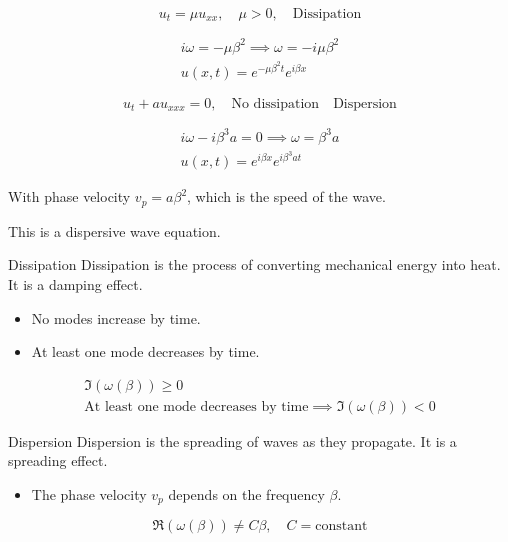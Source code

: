 \begin{example}{}{}
  \[
    u_t = \mu u_{xx}, \quad \mu > 0, \quad \text{Dissipation}
  \]

  \begin{align*}
    i\omega = -\mu \beta^2 \implies \omega = -i\mu \beta^2 \\
    u(x,t) = e^{-\mu \beta^2 t}e^{i\beta x}
  \end{align*}

\end{example}

\begin{example}{}{}
  \[
    u_t + a u_{xxx} = 0, \quad \text{No dissipation} \quad \text{Dispersion}
  \]

  \begin{align*}
    i\omega - i\beta^3 a = 0 \implies \omega = \beta^3 a \\
    u(x,t) = e^{i\beta x}e^{i\beta^3 a t}
  \end{align*}

  With phase velocity \(v_p = a \beta^2\), which is the speed of the wave.

  This is a dispersive wave equation.
\end{example}


\begin{definition}{Dissipation}{}
  Dissipation is the process of converting mechanical energy into heat. It is a damping effect.

  \begin{itemize}
    \item No modes increase by time.
    \item At least one mode decreases by time.
  \end{itemize}

  \begin{align*}
    \Im(\omega(\beta)) \geq 0 \\
    \text{At least one mode decreases by time} \implies \Im(\omega(\beta)) < 0
  \end{align*}
\end{definition}

\begin{definition}{Dispersion}{}
  Dispersion is the spreading of waves as they propagate. It is a spreading effect.

  \begin{itemize}
    \item The phase velocity \(v_p\) depends on the frequency \(\beta\).
  \end{itemize}
  \[
    \Re(\omega(\beta)) \neq C \beta, \quad C = \text{constant}
  \]

\end{definition}


